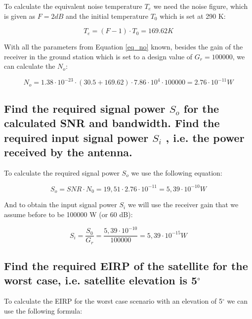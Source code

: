 \documentclass[a4paper,12pt,calibri,oneside,openany]{book}
\theoremstyle{break}
\begin{document}
		To calculate the equivalent noise temperature $T_{e}$ we need the noise figure, which is given as $F=2 \unit{dB}$ and the initial temperature $T_{0}$ which is set at 290 K:
		
		\begin{equation} \label{eq_te}
			T_{e} = (F - 1) \cdot T_{0} = 169.62 \unit{K} 
		\end{equation}
	 	
	 	With all the parameters from Equation \ref{eq_no} known, besides the  gain of the receiver in the ground station which is set to a design value of $G_{r}= 100000$, we can calculate the $N_{o}$:
	 	
	 	\begin{equation} \label{eq_no2}
	 		N_{o} = 1.38 \cdot 10^{-23} \cdot \left(30.5 + 169.62 \right) \cdot 7.86 \cdot 10^{4} \cdot 100000 = 2.76 \cdot 10^{-11} \unit{W}
	 	\end{equation}
	 		
	\subsection{Find the required signal power $S_{o}$ for the calculated SNR and bandwidth. Find the required input signal power $S_{i}$ , i.e. the power received by the antenna.}
	
		To calculate the required signal power $S_{o}$ we use the following equation:
	
		\begin{equation} \label{eq_so}
			S_{o} = SNR \cdot N_{0} = 19,51 \cdot 2.76 \cdot 10^{-11} = 5,39 \cdot 10^{-10}  \unit{W}
		\end{equation}
	
		And to obtain the input signal power $S_{i}$ we will use the receiver gain that we assume before to be 100000 W (or 60 dB):
		
		\begin{equation} \label{eq_si}
			S_{i} = \dfrac{S_{0}}{G_{r}}= \dfrac{5,39 \cdot 10^{-10}}{100000} = 5,39 \cdot 10^{-15}  \unit{W}
		\end{equation}		
	
	\subsection{Find the required EIRP of the satellite for the worst case, i.e. satellite elevation is 5$^{\circ}$}
	
		To calculate the EIRP for the worst case scenario with an elevation of 5$^{\circ}$ we can use the following formula:
		
\end{document}
